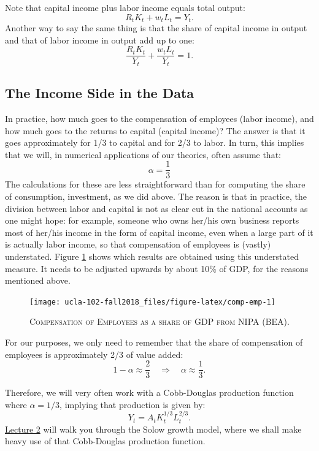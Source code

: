 \documentclass[]{book}
\theoremstyle{definition}
\theoremstyle{definition}
\theoremstyle{definition}
\theoremstyle{remark}
\begin{document}
Note that capital income plus labor income equals total output:
\[R_t K_t + w_t L_t = Y_t.\] Another way to say the same thing is that
the share of capital income in output and that of labor income in output
add up to one: \[\boxed{\frac{R_t K_t}{Y_t} + \frac{w_t L_t}{Y_t}=1}.\]

\subsection{The Income Side in the
Data}\label{the-income-side-in-the-data}

In practice, how much goes to the compensation of employees (labor
income), and how much goes to the returns to capital (capital income)?
The answer is that it goes approximately for 1/3 to capital and for 2/3
to labor. In turn, this implies that we will, in numerical applications
of our theories, often assume that: \[\alpha = \frac{1}{3}\] The
calculations for these are less straightforward than for computing the
share of consumption, investment, as we did above. The reason is that in
practice, the division between labor and capital is not as clear cut in
the national accounts as one might hope: for example, someone who owns
her/his own business reports most of her/his income in the form of
capital income, even when a large part of it is actually labor income,
so that compensation of employees is (vastly) understated. Figure
\ref{fig:comp-emp} shows which results are obtained using this
understated measure. It needs to be adjusted upwards by about 10\% of
GDP, for the reasons mentioned above.




\begin{figure}

{\centering \texttt{[image: ucla-102-fall2018\_files/figure-latex/comp-emp-1]} 

}

\caption{\textsc{Compensation of Employees as a share of GDP
from NIPA (BEA)}.}\label{fig:comp-emp}
\end{figure}

For our purposes, we only need to remember that the share of
compensation of employees is approximately 2/3 of value added:
\[1-\alpha \approx \frac{2}{3} \quad \Rightarrow \quad \boxed{\alpha \approx \frac{1}{3}}.\]

Therefore, we will very often work with a Cobb-Douglas production
function where \(\alpha=1/3\), implying that production is given by:
\[Y_t = A_t K_t^{1/3} L_t^{2/3}.\]
\protect\hyperlink{lecture-solow}{Lecture 2} will walk you through the
Solow growth model, where we shall make heavy use of that Cobb-Douglas
production function.
\end{document}
